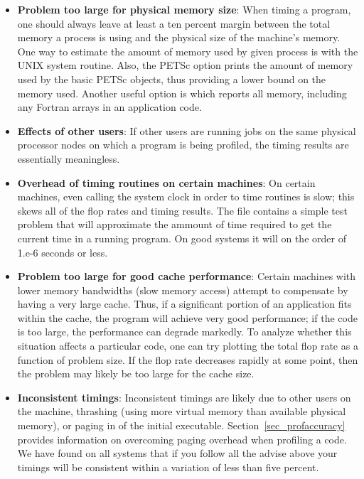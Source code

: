{{\begin{itemize}
\item {\bf Problem too large for physical memory size}: When timing a program, one
      should always leave at least a ten percent margin between the total
      memory a process is using and the physical size of 
      the machine's memory. One way to estimate the amount of 
      memory used by given process is with the UNIX  system routine.
      Also, the PETSc option  prints the amount of 
      memory used by the basic PETSc objects, thus providing a lower
      bound on the memory used.  Another useful option is 
      which reports all memory, including any Fortran arrays in an
      application code.
\item {\bf Effects of other users}:  If other users are running
      jobs on the same physical processor nodes on which a program is being profiled,
      the timing results are essentially meaningless. 
\item {\bf Overhead of timing routines on certain machines}: On certain machines,
      even calling the system clock in order to time routines is 
      slow; this skews all of the flop rates and timing results. The file
       contains a
      simple test problem that will approximate the ammount of time
      required to get the current time in a running program. On good
      systems it will on the order of 1.e-6 seconds or less.
\item {\bf Problem too large for good cache performance}: Certain machines
      with lower memory bandwidths (slow memory access) attempt to 
      compensate by having a very large cache.  Thus, if a significant
      portion of an application fits within the cache, the program will achieve very 
      good performance; if the code is too large, the performance can degrade markedly.
      To analyze whether this situation affects a particular code, one can
      try plotting the total flop rate as a function of problem
      size.  If the flop rate decreases rapidly at some point, then the
      problem may likely be too large for the cache size. 
\item {\bf Inconsistent timings}:  Inconsistent timings are likely due to other
      users on the machine, thrashing (using more virtual memory than available
      physical memory), or paging in of the initial executable.  
      Section~\ref{sec_profaccuracy} provides information on overcoming paging
      overhead when profiling a code. We have found on all systems that if you 
      follow all the advise above your timings will be consistent within a variation
      of less than five percent.
\end{itemize}

}}
